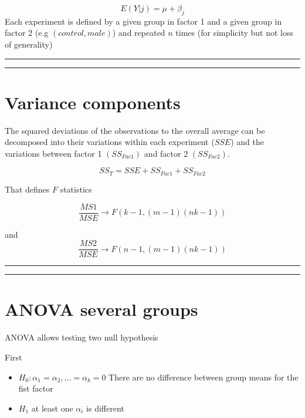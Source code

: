 \documentclass[
]{book}
\begin{document}
\[E(Y|j)=\mu + \beta_j\]
Each experiment is defined by a given group in factor 1 and a given group in factor 2 (e.g \((control, male)\)) and repeated \(n\) times (for simplicity but not loss of generality)

\begin{center}\rule{0.5\linewidth}{0.5pt}\end{center}

\begin{center}\rule{0.5\linewidth}{0.5pt}\end{center}

\hypertarget{variance-components-3}{%
\section{Variance components}\label{variance-components-3}}

The squared deviations of the observations to the overall average can be decomposed into their variations within each experiment (\(SSE\)) and the variations between factor 1 \((SS_{Fac1})\) and factor 2 \((SS_{Fac2})\).

\[SS_T= SSE + SS_{Fac1} + SS_{Fac2}\]

That defines \(F\) statistics

\[\frac{MS1}{MSE} \rightarrow F(k-1,(m-1)(nk-1))\]

and \[\frac{MS2}{MSE}\rightarrow F(n-1,(m-1)(nk-1))\]

\begin{center}\rule{0.5\linewidth}{0.5pt}\end{center}

\begin{center}\rule{0.5\linewidth}{0.5pt}\end{center}

\hypertarget{anova-several-groups-5}{%
\section{ANOVA several groups}\label{anova-several-groups-5}}

ANOVA allows testing two null hypothesis

First

\begin{itemize}
\item
  \(H_0: \alpha_1=\alpha_2, ...=\alpha_k=0\) There are no difference between group means for the fist factor
\item
  \(H_1\) at least one \(\alpha_i\) is different
\end{itemize}
\end{document}
